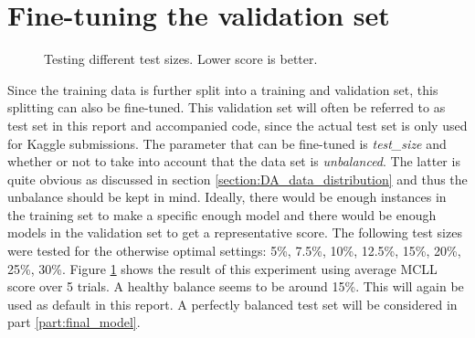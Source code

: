 
\section{Fine-tuning the validation set}
\label{section:LBM_finetuning_validation_set}

\begin{figure}
    \centering
    \vspace*{-0.5cm}
    \captionsetup{width=0.85\linewidth}
    \captionsetup{justification=centering}
    \caption{Testing different test sizes. Lower score is better.}
    \label{fig:2-LBM-test_size_sift}
\end{figure}

Since the training data is further split into a training and validation set, this splitting can also be fine-tuned.
This validation set will often be referred to as test set in this report and accompanied code, since the actual test set is only used for Kaggle submissions.
The parameter that can be fine-tuned is \textit{test\_size} and whether or not to take into account that the data set is \textit{unbalanced}.
The latter is quite obvious as discussed in section \ref{section:DA_data_distribution} and thus the unbalance should be kept in mind.
Ideally, there would be enough instances in the training set to make a specific enough model and there would be enough models in the validation set to get a representative score. 
The following test sizes were tested for the otherwise optimal settings: 5\%, 7.5\%, 10\%, 12.5\%, 15\%, 20\%, 25\%, 30\%.
Figure \ref{fig:2-LBM-test_size_sift} shows the result of this experiment using average MCLL score over 5 trials.
A healthy balance seems to be around 15\%.
This will again be used as default in this report.
A perfectly balanced test set will be considered in part \ref{part:final_model}.


